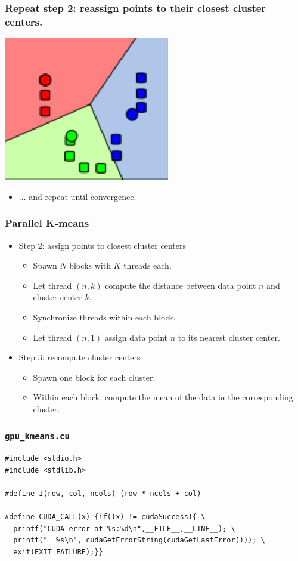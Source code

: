 \documentclass[handout]{beamer}
\numberwithin{equation}{section}
\begin{document}
\begin{frame}
\frametitle{Repeat step 2: reassign points to their closest cluster centers.}
\begin{center}
\includegraphics[scale=.6]{../../fig/kmeans4.png}
\end{center}
\begin{itemize}
\item $\ldots$ and repeat until convergence.
\end{itemize}
\end{frame}

\begin{frame}
\frametitle{Parallel K-means}
\begin{itemize}
\item Step 2: assign points to closest cluster centers
\begin{itemize}
\pause \item Spawn $N$ blocks with $K$ threads each.
\pause \item Let thread $(n, k)$ compute the distance between data point $n$ and cluster center $k$.
\pause \item Synchronize threads within each block.
\pause \item Let thread $(n, 1)$ assign data point $n$ to its nearest cluster center.
\end{itemize}
\pause \item Step 3: recompute cluster centers
\begin{itemize}
\pause \item Spawn one block for each cluster.
\pause \item Within each block, compute the mean of the data in the corresponding cluster.
\end{itemize}
\end{itemize}
\end{frame}


\begin{frame}[fragile]
\frametitle{{\tt gpu\_kmeans.cu}}
\begin{lstlisting}[name=km]
#include <stdio.h>
#include <stdlib.h>

#define I(row, col, ncols) (row * ncols + col)

#define CUDA_CALL(x) {if((x) != cudaSuccess){ \
  printf("CUDA error at %s:%d\n",__FILE__,__LINE__); \
  printf("  %s\n", cudaGetErrorString(cudaGetLastError())); \
  exit(EXIT_FAILURE);}} 
\end{lstlisting}
\end{frame}
\end{document}
